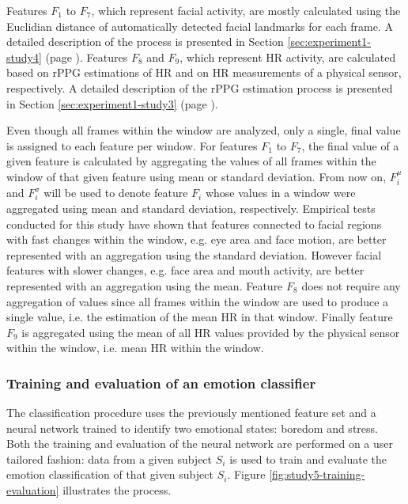 Features $F_1$ to $F_7$, which represent facial activity, are mostly calculated using the Euclidian distance of automatically detected facial landmarks for each frame. A detailed description of the process is presented in Section \ref{sec:experiment1-study4} (page \pageref{sec:experiment1-study4}). Features $F_8$ and $F_9$, which represent HR activity, are calculated based on rPPG estimations of HR and on HR measurements of a physical sensor, respectively. A detailed description of the rPPG estimation process is presented in Section \ref{sec:experiment1-study3} (page \pageref{sec:experiment1-study3}).

Even though all frames within the window are analyzed, only a single, final value is assigned to each feature per window. For features $F_1$ to $F_7$, the final value of a given feature is calculated by aggregating the values of all frames within the window of that given feature using mean or standard deviation. From now on, $F_i^\mu$ and $F_i^\sigma$ will be used to denote feature $F_i$ whose values in a window were aggregated using mean and standard deviation, respectively. Empirical tests conducted for this study have shown that features connected to facial regions with fast changes within the window, e.g. eye area and face motion, are better represented with an aggregation using the standard deviation. However facial features with slower changes, e.g. face area and mouth activity, are better represented with an aggregation using the mean. Feature $F_8$ does not require any aggregation of values since all frames within the window are used to produce a single value, i.e. the estimation of the mean HR in that window. Finally feature $F_9$ is aggregated using the mean of all HR values provided by the physical sensor within the window, i.e. mean HR within the window.

\subsubsection{Training and evaluation of an emotion classifier}
\label{sec:experiment1-study5-training-evaluation}

The classification procedure uses the previously mentioned feature set and a neural network trained to identify two emotional states: boredom and stress. Both the training and evaluation of the neural network are performed on a user tailored fashion: data from a given subject $S_i$ is used to train and evaluate the emotion classification of that given subject $S_i$. Figure \ref{fig:study5-training-evaluation} illustrates the process.

